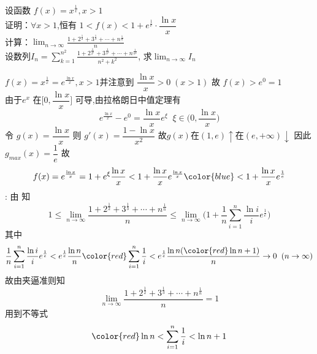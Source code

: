 \documentclass[color=green,titlestyle=hang]{elegantbook}%
\begin{document}
\begin{exercise}
设函数 $\displaystyle f(x)=x^{\frac{1}{x}}, x>1$\\[1mm]
 证明：$\forall x>1$,恒有 $ 1<f(x)<1+e^{\frac{1}{e}}\cdot\dfrac{\ln x}{x}$\\[1mm]
  计算：$\displaystyle\lim_{n\to\infty}\frac{1+2^{\frac{1}{2}}+3^{\frac{1}{3}}+\cdots+n^{\frac{1}{n}}}{n}$\\[1mm]
 设数列$\displaystyle I_n=\sum_{k=1}^{n^2}\frac{1+2^{\frac{1}{2^k}}+3^{\frac{1}{3^k}}+\cdots+n^{\frac{1}{n^k}}}{n^2+k^2}$, 求$\displaystyle\lim_{n\to\infty} I_n$	
\end{exercise}\begin{Solution}
 $\displaystyle f(x)=x^{\frac{1}{x}}=e^{\frac{\ln x}{x}}, x>1$并注意到 $\dfrac{\ln x}{x}>0\;(x>1)$ 故 $\displaystyle f(x)>e^0=1$\\[1mm]
由于$e^x$ 在$\Big[0,\dfrac{\ln x}{x}\Big]$ 可导,由拉格朗日中值定理有
\begin{equation*}
e^{\frac{\ln x}{x}}-e^{0}=\frac{\ln x}{x}e^{\xi}\;\;\xi\in\Big(0,\dfrac{\ln x}{x}\Big)
\end{equation*}
令 $g(x)=\dfrac{\ln x}{x}$ 则 $g'(x)=\dfrac{1-\ln x}{x^2}$ 故$g(x)$在$(1,e)\uparrow$在$(e,+\infty)\downarrow$ 因此$g_{max}(x)=\dfrac{1}{e}$
故\begin{equation*}
f(x)=e^{\frac{\ln x}{x}}=1+e^{\xi}\frac{\ln x}{x}<1+\frac{\ln x}{x}e^{\frac{\ln x}{x}}{\color{blue}<1+\frac{\ln x}{x}e^{\frac{1}{e}}}
\end{equation*}
:\; 由  知
\begin{equation*}
1\leqslant\lim_{n\to\infty}\frac{1+2^{\frac{1}{2}}+3^{\frac{1}{3}}+\cdots+n^{\frac{1}{n}}}{n}\leqslant\lim_{n\to\infty}\Big(1+\frac{1}{n}\sum\limits_{i=1}^{n}\frac{\ln i}{i}e^{\frac{1}{e}}\Big)
\end{equation*}
其中
\begin{equation*}
\frac{1}{n}\sum\limits_{i=1}^{n}\frac{\ln i}{i}e^{\frac{1}{e}}<e^{\frac{1}{e}}\frac{\ln n}{n}{\color{red}\sum\limits_{i=1}^{n}\frac{1}{i}}<e^{\frac{1}{e}}\frac{\ln n({\color{red}\ln n+1})}{n}\rightarrow0\;\;(n\to\infty)
\end{equation*}
故由夹逼准则知
\begin{equation*}\lim_{n\to\infty}\frac{1+2^{\frac{1}{2}}+3^{\frac{1}{3}}+\cdots+n^{\frac{1}{n}}}{n}=1\end{equation*}
用到不等式\begin{equation*}{\color{red}\ln n<\sum\limits_{i=1}^{n}\frac{1}{i}<\ln n+1}\end{equation*}

\end{Solution}
\end{document}
